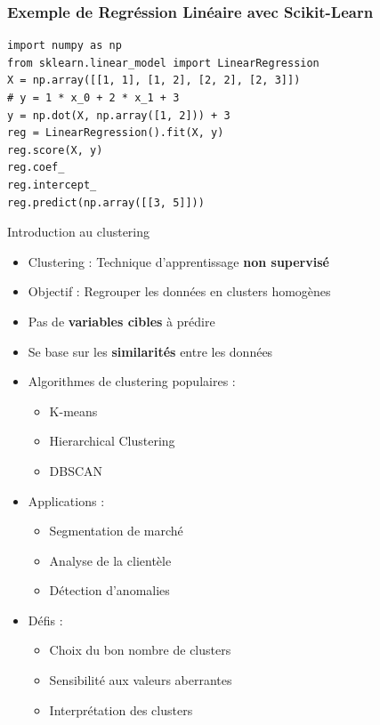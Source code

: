 \documentclass{beamer}
\begin{document}
\begin{frame}[fragile]
	\frametitle{Exemple de Regréssion Linéaire avec Scikit-Learn}
\begin{lstlisting}
import numpy as np
from sklearn.linear_model import LinearRegression
X = np.array([[1, 1], [1, 2], [2, 2], [2, 3]])
# y = 1 * x_0 + 2 * x_1 + 3
y = np.dot(X, np.array([1, 2])) + 3
reg = LinearRegression().fit(X, y)
reg.score(X, y)
reg.coef_
reg.intercept_
reg.predict(np.array([[3, 5]]))
\end{lstlisting}
\end{frame}


\begin{frame}{Introduction au clustering}
\begin{itemize}
	\item Clustering : Technique d'apprentissage \textbf{non supervisé}
	\item Objectif : Regrouper les données en clusters homogènes
	\item Pas de \textbf{variables cibles} à prédire
	\item Se base sur les \textbf{similarités} entre les données
	\item Algorithmes de clustering populaires :
	\begin{itemize}
		\item K-means
		\item Hierarchical Clustering
		\item DBSCAN
	\end{itemize}
	\item Applications :
	\begin{itemize}
		\item Segmentation de marché
		\item Analyse de la clientèle
		\item Détection d'anomalies
	\end{itemize}
	\item Défis :
	\begin{itemize}
		\item Choix du bon nombre de clusters
		\item Sensibilité aux valeurs aberrantes
		\item Interprétation des clusters
	\end{itemize}
\end{itemize}
\end{frame}
\end{document}
